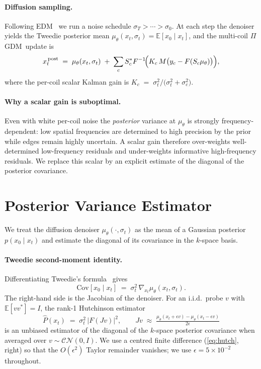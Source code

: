 \documentclass[conference]{IEEEtran}
\newcommand{\xz}{x_0}
\newcommand{\xt}{x_t}
\newcommand{\sigt}{\sigma_t}
\newcommand{\PV}{\hat{P}}
\newcommand{\PIGDM}{$\Pi$GDM}
\begin{document}
\paragraph{Diffusion sampling.} Following EDM~\cite{karras2022edm} we
run a noise schedule $\sigma_T > \cdots > \sigma_0$. At each step the
denoiser yields the Tweedie posterior mean
$\mu_\theta(\xt,\sigt) = \mathbb{E}[\xz \mid \xt]$, and the multi-coil
\PIGDM\ update is
\begin{equation}
  \xt^{\,\text{post}} \;=\; \mu_\theta(\xt,\sigt)
  \;+\; \sum_c S_c^{*} F^{-1}\!\Bigl(K_c\,M\bigl(y_c - F(S_c \mu_\theta)\bigr)\Bigr),
  \label{eq:pigdm}
\end{equation}
where the per-coil scalar Kalman gain is
$K_c \;=\; \sigt^{2} / \bigl(\sigt^{2} + \sigma_c^{2}\bigr)$.

\paragraph{Why a scalar gain is suboptimal.} Even with white per-coil
noise the \emph{posterior} variance at $\mu_\theta$ is strongly
frequency-dependent: low spatial frequencies are determined to high
precision by the prior while edges remain highly uncertain. A scalar
gain therefore over-weights well-determined low-frequency residuals
and under-weights informative high-frequency residuals. We replace
this scalar by an explicit estimate of the diagonal of the posterior
covariance.

\section{Posterior Variance Estimator}\label{sec:pv}

We treat the diffusion denoiser $\mu_\theta(\cdot,\sigt)$ as the mean
of a Gaussian posterior $p(\xz \mid \xt)$ and estimate the diagonal
of its covariance in the $k$-space basis.

\paragraph{Tweedie second-moment identity.} Differentiating Tweedie's
formula~\cite{efron2011tweedie} gives
\begin{equation}
  \mathrm{Cov}[\xz \mid \xt] \;=\; \sigt^{2}\,\nabla_{\xt}\mu_\theta(\xt,\sigt).
  \label{eq:tweedie2}
\end{equation}
The right-hand side is the Jacobian of the denoiser. For an
i.i.d.\ probe $v$ with $\mathbb{E}[vv^{*}] = I$, the rank-1 Hutchinson
estimator
\begin{equation}
  \PV(\xt) \;=\; \sigt^{2}\,\bigl|F(Jv)\bigr|^{2},\qquad
  Jv \;\approx\; \tfrac{\mu_\theta(\xt+\epsilon v) - \mu_\theta(\xt-\epsilon v)}{2\epsilon}
  \label{eq:hutch}
\end{equation}
is an unbiased estimator of the diagonal of the $k$-space posterior
covariance when averaged over $v \sim \mathcal{CN}(0,I)$. We use a
centred finite difference (\cref{eq:hutch}, right) so that the
$O(\epsilon^{2})$ Taylor remainder vanishes; we use
$\epsilon{=}5{\times}10^{-2}$ throughout.
\end{document}
